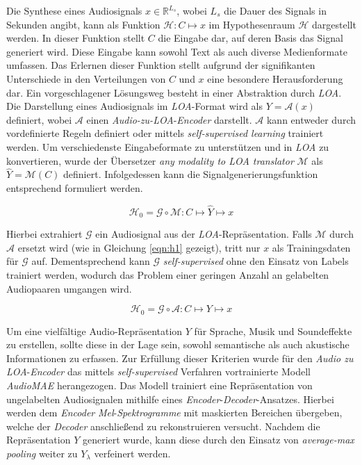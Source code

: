 \documentclass[
  a4paper,  %
  twoside,  %
  bibliography=totoc,
  headsepline,
  cleardoublepage=empty,
  parskip=half,
  draft=false
]{scrbook}
\begin{document}
Die Synthese eines Audiosignals $x \in \mathbb{R}^{L_s}$, wobei $L_s$ die Dauer des Signals in Sekunden angibt, kann als Funktion $\mathcal{H}: C \mapsto x$ im Hypothesenraum $\mathcal{H}$ dargestellt werden. In dieser Funktion stellt $C$ die Eingabe dar, auf deren Basis das Signal generiert wird. Diese Eingabe kann sowohl Text als auch diverse Medienformate umfassen. Das Erlernen dieser Funktion stellt aufgrund der signifikanten Unterschiede in den Verteilungen von $C$ und $x$ eine besondere Herausforderung dar. Ein vorgeschlagener Lösungsweg besteht in einer Abstraktion durch \emph{LOA}. Die Darstellung eines Audiosignals im \emph{LOA}-Format wird als $Y=\mathcal{A}(x)$ definiert, wobei $\mathcal{A}$ einen \emph{Audio-zu-LOA}-\emph{Encoder} darstellt. $\mathcal{A}$ kann entweder durch vordefinierte Regeln definiert oder mittels \emph{self-supervised learning} \cite{tan_regeneration_2023} trainiert werden. Um verschiedenste Eingabeformate zu unterstützen und in \emph{LOA} zu konvertieren, wurde der Übersetzer \emph{any modality to LOA translator} $\mathcal{M}$ als $\hat{Y}=\mathcal{M}(C)$ definiert. Infolgedessen kann die Signalgenerierungsfunktion entsprechend formuliert werden. \cite{liu_audioldm2_2023}

\begin{equation}
    \mathcal{H}_0=\mathcal{G} \circ \mathcal{M}: C \mapsto \hat{Y} \mapsto x
\end{equation}

Hierbei extrahiert $\mathcal{G}$ ein Audiosignal aus der \emph{LOA}-Repräsentation. Falls $\mathcal{M}$ durch $\mathcal{A}$ ersetzt wird  (wie in Gleichung \ref{eqn:h1} gezeigt), tritt nur $x$ als Trainingsdaten für $\mathcal{G}$ auf. Dementsprechend kann $\mathcal{G}$ \emph{self-supervised} ohne den Einsatz von Labels trainiert werden, wodurch das Problem einer geringen Anzahl an gelabelten Audiopaaren umgangen wird. \cite{liu_audioldm2_2023}

\begin{equation}
\label{eqn:h1}
    \mathcal{H}_0=\mathcal{G} \circ \mathcal{A}: C \mapsto Y \mapsto x
\end{equation}

Um eine vielfältige Audio-Repräsentation $Y$ für Sprache, Musik und Soundeffekte zu erstellen, sollte diese in der Lage sein, sowohl semantische als auch akustische Informationen zu erfassen. Zur Erfüllung dieser Kriterien wurde für den \emph{Audio zu LOA}-\emph{Encoder} das mittels \emph{self-supervised} Verfahren vortrainierte Modell \emph{AudioMAE} \cite{huang_masked_2023} herangezogen. Das Modell trainiert eine Repräsentation von ungelabelten Audiosignalen mithilfe eines \emph{Encoder}-\emph{Decoder}-Ansatzes. Hierbei werden dem \emph{Encoder} \emph{Mel}-\emph{Spektrogramme} mit maskierten Bereichen übergeben, welche der \emph{Decoder} anschließend zu rekonstruieren versucht. Nachdem die Repräsentation $Y$ generiert wurde, kann diese durch den Einsatz von \emph{average-max pooling} \cite{liu_simple_2023} weiter zu $Y_\lambda$ verfeinert werden. \cite{liu_audioldm2_2023}
\end{document}
